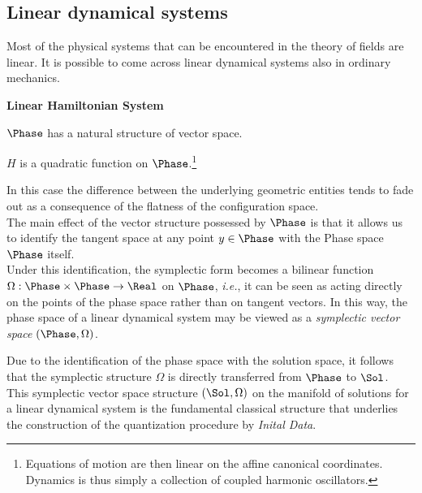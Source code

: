 \documentclass[Main]{subfiles}
\begin{document}
	\subsection{Linear dynamical systems}\label{Section:LinearClassicalSystem}
	Most of the physical systems that can be encountered in the theory of fields are linear.	
	It is possible to come across linear dynamical systems also in ordinary mechanics. 
		\begin{remark}
			\textbf{Linear Hamiltonian System}
			\begin{compactitemize}
				\item $\Phase$ has a natural structure of vector space.
				\item	$H$ is a quadratic function on $\Phase$.\footnote{Equations of motion are then linear on the affine canonical coordinates. Dynamics is thus simply a collection of coupled harmonic oscillators.}
			\end{compactitemize}
		\end{remark}
	\vspace{3mm}
	In this case the difference between the underlying geometric entities tends to fade out as a consequence of the flatness of the configuration space.
	\\
	The main effect of the vector structure possessed by $\Phase$  is that it allows us to identify the tangent space at any point $y \in \Phase$ with the Phase space $\Phase$ itself.
	\\
	Under this identification, the symplectic form becomes a bilinear function $\Omega: \Phase \times \Phase \rightarrow \Real$ on $\Phase$, \textit{i.e.}, it can be seen as acting directly on the points of the phase space rather than on tangent vectors.
	In this way, the phase space of a linear dynamical system may be viewed  as a \emph{symplectic vector space} $(\Phase, \Omega)$.
	
	Due to the identification of the phase space with the solution space, it follows that the symplectic structure $\Omega$ is directly transferred from $\Phase$ to $\Sol$.\\
	This symplectic vector space structure $( \Sol	, \Omega)$ on the manifold of solutions for a linear dynamical system is the fundamental classical structure that underlies the construction of the quantization procedure by  \emph{Inital Data}.
	
\end{document}

